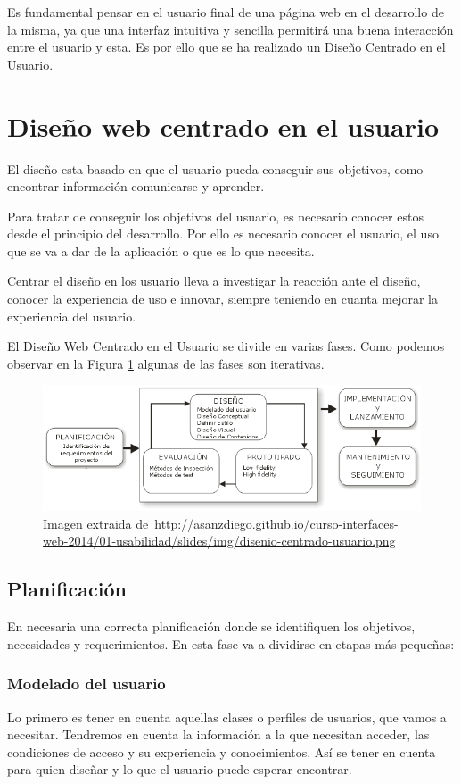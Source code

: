 
Es fundamental pensar en el usuario final de una página web en el desarrollo de la misma, ya que una interfaz intuitiva y sencilla permitirá una buena interacción entre el usuario y esta. Es por ello que se ha realizado un Diseño Centrado en el Usuario.
\section{Diseño web centrado en el usuario}
El diseño esta basado en que el usuario pueda conseguir sus objetivos, como encontrar información comunicarse y aprender.

Para tratar de conseguir los objetivos del usuario, es necesario conocer estos desde el principio del desarrollo. Por ello es necesario conocer el usuario, el uso que se va a dar de la aplicación o que es lo que necesita.

Centrar el diseño en los usuario lleva a investigar la reacción ante el diseño, conocer la experiencia de uso e innovar, siempre teniendo en cuanta mejorar la experiencia del usuario.

El Diseño Web Centrado en el Usuario se divide en varias fases. Como podemos observar en la Figura \ref{fig:DisCenUsu} algunas de las fases son iterativas.
\begin{figure}
\centering
\includegraphics[width=.9\textwidth]{img/diseno_centrado_usuario}
\caption[Fases del Diseño Centrado en el Usuario.]{Imagen extraida de~\url{http://asanzdiego.github.io/curso-interfaces-web-2014/01-usabilidad/slides/img/disenio-centrado-usuario.png}}
\label{fig:DisCenUsu}
\end{figure}
\subsection{Planificación}
En necesaria una correcta planificación donde se identifiquen los objetivos, necesidades y requerimientos. En esta fase va a dividirse en etapas más pequeñas:

\subsubsection{Modelado del usuario}
Lo primero es tener en cuenta aquellas clases o perfiles de usuarios, que vamos a necesitar. Tendremos en cuenta la información a la que necesitan acceder, las condiciones de acceso y su experiencia y conocimientos. Así se tener  en cuenta para quien diseñar y lo que el usuario puede esperar encontrar.

